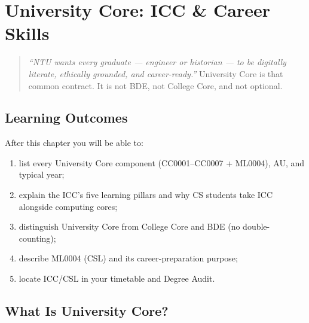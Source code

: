\chapter{University Core: ICC \& Career Skills}
\label{ch:university-core}

\begin{quote}
\emph{``NTU wants every graduate --- engineer or historian --- to be digitally literate, ethically grounded, and career-ready.''} University Core is that common contract. It is not BDE, not College Core, and not optional.
\end{quote}

\noindent{}
\vspace{0.4em}

\section*{Learning Outcomes}
After this chapter you will be able to:
\begin{enumerate}[label=(L\arabic*)]
    \item list every University Core component (CC0001--CC0007 + ML0004), AU, and typical year;
    \item explain the ICC's five learning pillars and why CS students take ICC alongside computing cores;
    \item distinguish University Core from College Core and BDE (no double-counting);
    \item describe ML0004 (CSL) and its career-preparation purpose;
    \item locate ICC/CSL in your timetable and Degree Audit.
\end{enumerate}

\section{What Is University Core?}
\label{sec:what-icc}

